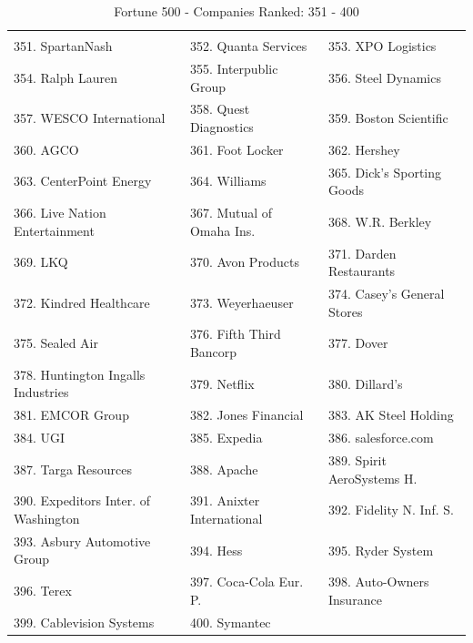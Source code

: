 \documentclass{book}
\begin{document}
\begin{table}[H]
\centering
\caption{Fortune 500 - Companies Ranked: 351 - 400}
\begin{tabular}{lll}
\hline
 \\ 351. SpartanNash 
&  352. Quanta Services 
&  353. XPO Logistics 
\\ 354. Ralph Lauren 
&  355. Interpublic Group 
&  356. Steel Dynamics 
\\ 357. WESCO International 
&  358. Quest Diagnostics 
&  359. Boston Scientific 
\\ 360. AGCO 
&  361. Foot Locker 
&  362. Hershey 
\\ 363. CenterPoint Energy 
&  364. Williams 
&  365. Dick's Sporting Goods 
\\ 366. Live Nation Entertainment 
&  367. Mutual of Omaha Ins. 
&  368. W.R. Berkley 
\\ 369. LKQ 
&  370. Avon Products 
&  371. Darden Restaurants 
\\ 372. Kindred Healthcare 
&  373. Weyerhaeuser 
&  374. Casey's General Stores 
\\ 375. Sealed Air 
&  376. Fifth Third Bancorp 
&  377. Dover 
\\ 378. Huntington Ingalls Industries 
&  379. Netflix 
&  380. Dillard's 
\\ 381. EMCOR Group 
&  382. Jones Financial 
&  383. AK Steel Holding 
\\ 384. UGI 
&  385. Expedia 
&  386. salesforce.com 
\\ 387. Targa Resources 
&  388. Apache 
&  389. Spirit AeroSystems H.
\\ 390. Expeditors Inter. of Washington 
&  391. Anixter International 
&  392. Fidelity N. Inf. S. 
\\ 393. Asbury Automotive Group 
&  394. Hess 
&  395. Ryder System 
\\ 396. Terex 
&  397. Coca-Cola Eur. P. 
&  398. Auto-Owners Insurance 
\\ 399. Cablevision Systems 
&  400. Symantec 
&   
 \\ \hline

\end{tabular}
\end{table}
\end{document}
